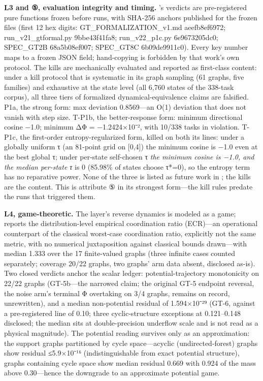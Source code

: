 \documentclass[11pt,a4paper]{article}
\begin{document}
\textbf{L3 and ⑤, evaluation integrity and timing.} \cite{key04}'s verdicts are pre-registered pure functions frozen before runs, with SHA-256 anchors published for the frozen files (first 12 hex digits: GT\_FORMALIZATION\_v1.md aeefb8ef6972; run\_v21\_gtformal.py 9bbe43f41fa8; run\_v22\_p1c.py 6e9673205dc0; SPEC\_GT2B 68a5b08ef007; SPEC\_GT8C 6b09de9911c0). Every key number maps to a frozen JSON field; hand-copying is forbidden by that work's own protocol. The kills are mechanically evaluated and reported as first-class content: under a kill protocol that is systematic in its graph sampling (61 graphs, five families) and exhaustive at the state level (all 6,760 states of the 338-task corpus), all three tiers of formalized dynamical-equivalence claims are falsified. P1a, the strong form: max deviation 0.8569—an O(1) deviation that does not vanish with step size. T-P1b, the better-response form: minimum directional cosine −1.0; minimum ΔΦ = −1.2424×10⁻², with 10/338 tasks in violation. T-P1c, the first-order entropy-regularized form, killed on both its lines: under a globally uniform τ (an 81-point grid on [0,4]) the minimum cosine is −1.0 even at the best global τ; under per-state self-chosen τ\textit{ the minimum cosine is −1.0, and the median per-state τ} is 0 (85.98\% of states choose τ*=0), so the entropy term has no reparative power. None of the three is listed as future work in \cite{key04}; the kills are the content. This is attribute ⑤ in its strongest form—the kill rules predate the runs that triggered them.

\textbf{L4, game-theoretic.} The layer's reverse dynamics is modeled as a game; \cite{key04} reports the distribution-level empirical coordination ratio (ECR)—an operational counterpart of the classical worst-case coordination ratio, explicitly not the same metric, with no numerical juxtaposition against classical bounds drawn—with median 1.333 over the 17 finite-valued graphs (three infinite cases counted separately; coverage 20/22 graphs, two graphs' arm data absent, disclosed as-is). Two closed verdicts anchor the scalar ledger: potential-trajectory monotonicity on 22/22 graphs (GT-5b—the narrowed claim; the original GT-5 endpoint reversal, the noise arm's terminal Φ overtaking on 3/4 graphs, remains on record, unrewritten), and a median non-potential residual of 1.594×10⁻²⁹ (GT-6, against a pre-registered line of 0.10; three cyclic-structure exceptions at 0.121–0.148 disclosed; the median sits at double-precision underflow scale and is not read as a physical magnitude). The potential reading survives only as an approximation: the support graphs partitioned by cycle space—acyclic (undirected-forest) graphs show residual ≤5.9×10⁻¹⁶ (indistinguishable from exact potential structure), graphs containing cycle space show median residual 0.669 with 0.924 of the mass above 0.30—hence the downgrade to an approximate potential game.
\end{document}
